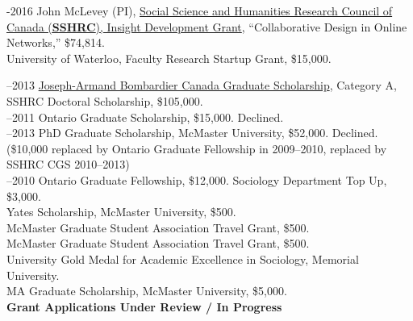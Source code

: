 \documentclass[9pt,usenames,dvipsnames]{article}
\begin{document}
-2016 John McLevey (PI), \href{http://www.sshrc-crsh.gc.ca/funding-financement/programs-programmes/insight_development_grants-su
bventions_de_developpement_savoir-eng.aspx}{Social Science and Humanities Research Council of Canada (\textbf{SSHRC}), Insight Development Grant}, ``Collaborative Design in Online Networks,'' \$74,814. \\

 University of Waterloo, Faculty Research Startup Grant, \$15,000. \\

\smallskip
{}

–2013 \href{http://www.sshrc-crsh.gc.ca/funding-financement/programs-programmes/fellowships/doctoral-doctorat-eng.aspx}{Joseph-Armand Bombardier Canada Graduate Scholarship}, Category A, SSHRC Doctoral Scholarship, \$105,000.\\

–2011 Ontario Graduate Scholarship, \$15,000. Declined.\\

–2013 PhD Graduate Scholarship, McMaster University, \$52,000. Declined. (\$10,000 replaced by Ontario Graduate Fellowship in 2009–2010, replaced by SSHRC CGS 2010–2013)\\

–2010 Ontario Graduate Fellowship, \$12,000. Sociology Department Top Up, \$3,000.\\

 Yates Scholarship, McMaster University, \$500.\\

 McMaster Graduate Student Association Travel Grant, \$500.\\

 McMaster Graduate Student Association Travel Grant, \$500.\\

 University Gold Medal for Academic Excellence in Sociology, Memorial University.\\

 MA Graduate Scholarship, McMaster University, \$5,000.\\


\noindent \textbf{Grant Applications Under Review / In Progress} \\
\end{document}
